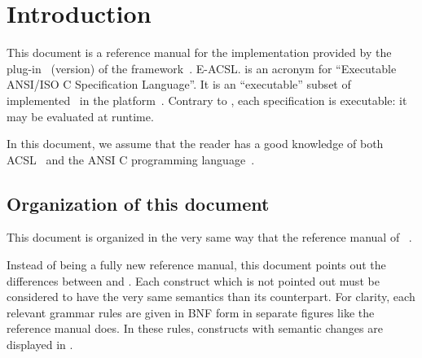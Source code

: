 \chapter{Introduction}

This document is a reference manual for
%
{the \eacsl implementation provided by the \eacsl plug-in~\cite{eacsl-plugin}
  (version\eacslpluginversion) of the \framac framework~\cite{framac}.}%
{E-ACSL.}
\eacsl is an acronym for ``Executable ANSI/ISO C
Specification Language''. It is an ``executable'' subset of
\acsl~\cite{acsl} implemented~\cite{acslimplem} in the \framac
platform~\cite{framac}. Contrary to \acsl, each \eacsl specification is
executable: it may be evaluated at runtime.

In this document, we assume that the reader has a good knowledge of both
ACSL~\cite{acsl} and the ANSI C programming language~\cite{standardc99,KR88}.

\section{Organization of this document}

This document is organized in the very same way that the reference manual of
\acsl~\cite{acsl}.

Instead of being a fully new reference manual, this document points out the
differences between \eacsl and \acsl. Each \eacsl construct which is not pointed
out must be considered to have the very same semantics than its \acsl
counterpart. For clarity, each relevant grammar rules are given in BNF form
in separate figures like the \acsl reference manual does. In these rules,
constructs with semantic changes are displayed in .

